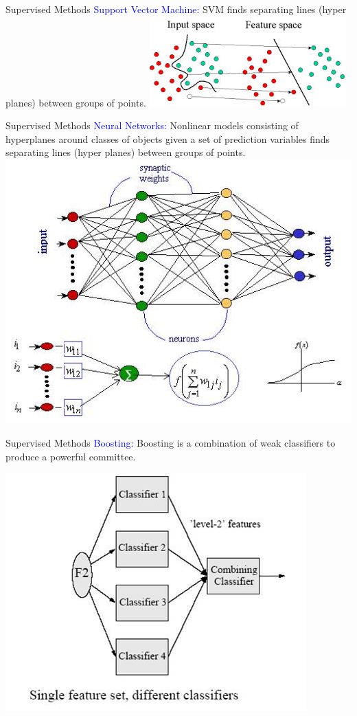 \documentclass[10pt,xcolor=dvipsnames]{beamer}\usepackage[]{graphicx}\usepackage[]{color}
\begin{document}
\begin{frame}{Supervised Methods}
\textcolor{blue}{Support Vector Machine:} SVM finds separating lines (hyper planes) between groups of points.
\bigskip
 \includegraphics{figures/svm.jpg}
\end{frame}


\begin{frame}{Supervised Methods}
\textcolor{blue}{Neural Networks:} Nonlinear models consisting of  hyperplanes around  classes of objects given a set of prediction variables finds separating lines (hyper planes) between groups of points.
 \includegraphics{figures/NN.jpg}
\end{frame}


\begin{frame}{Supervised Methods}
\textcolor{blue}{Boosting:} Boosting is a combination of weak classifiers to produce a 
   powerful committee. 

\bigskip
 \includegraphics{figures/boosting.jpg}
\end{frame}
\end{document}
